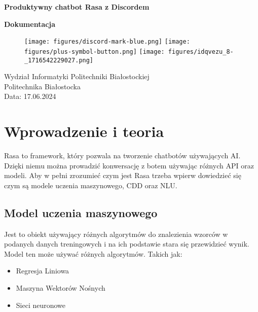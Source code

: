 \documentclass{article}
\begin{document}
\begin{titlepage}
    \AddToShipoutPicture*{\BackgroundPic}

   \begin{center}
       \textbf{Produktywny chatbot Rasa z Discordem}

       \textbf{Dokumentacja}


        \vspace{5cm}  
        
        \begin{figure}[htp]

        \centering
        \texttt{[image: figures/discord-mark-blue.png]}\hfill
        \texttt{[image: figures/plus-symbol-button.png]}\hfill
        \texttt{[image: figures/idqvezu\_8-\_1716542229027.png]}


        \end{figure}     
     
            
        \vspace{8cm}  

       Wydział Informatyki Politechniki Białostockiej\\
       Politechnika Białostocka\\
       Data: 17.06.2024
            
   \end{center}
\end{titlepage}

\tableofcontents

\section{Wprowadzenie i teoria}
Rasa to framework, który pozwala na tworzenie chatbotów używających AI. Dzięki
niemu można prowadzić konwersację z botem używając różnych API oraz modeli. Aby
w pełni zrozumieć czym jest Rasa trzeba wpierw dowiedzieć się czym są modele
uczenia maszynowego, CDD oraz NLU.

\subsection{Model uczenia maszynowego}
Jest to obiekt używający różnych algorytmów do znalezienia wzorców w podanych
danych treningowych i na ich podstawie stara się przewidzieć wynik. Model ten
może używać różnych algorytmów. Takich jak:
\begin{itemize}
    \item[\textcolor{violet}{\textbullet}] Regresja Liniowa
    \item[\textcolor{violet}{\textbullet}] Maszyna Wektorów Nośnych
    \item[\textcolor{violet}{\textbullet}] Sieci neuronowe
\end{itemize}
\end{document}
